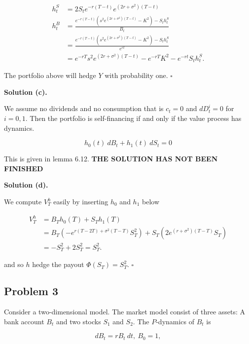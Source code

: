 \documentclass[
]{book}
\begin{document}
\begin{align*}
h_t^S&=2S_te^{-r(T-t)}e^{(2r+\sigma^2)(T-t)}\\
h_t^B&=\frac{e^{-r(T-t)}\left(s^2e^{(2r+\sigma^2)(T-t)}-K^2\right)-S_th_t^S}{B_t}\\
&=\frac{e^{-r(T-t)}\left(s^2e^{(2r+\sigma^2)(T-t)}-K^2\right)-S_th_t^S}{e^{rt}}\\
&=e^{-rT}s^2e^{(2r+\sigma^2)(T-t)}-e^{-rT}K^2-e^{-rt}S_th_t^S.
\end{align*}

The portfolio above will hedge \(Y\) with probability one. \(\square\)

\noindent\makebox[\linewidth]{\rule{\textwidth}{0.4pt}}

\textbf{Solution (c).}

We assume no dividends and no consumption that is \(c_t=0\) and \(dD_t^i=0\) for \(i=0,1\). Then the portfolio is self-financing if and only if the value process has dynamics.

\[
h_0(t)\ dB_t+h_1(t)\ dS_t=0
\]

This is given in lemma 6.12. \textbf{THE SOLUTION HAS NOT BEEN FINISHED}

\noindent\makebox[\linewidth]{\rule{\textwidth}{0.4pt}}

\textbf{Solution (d).}

We compute \(V_T^h\) easily by inserting \(h_0\) and \(h_1\) below

\begin{align*}
V_T^h&=B_Th_0(T)+S_Th_1(T)\\
&=B_T\left(-e^{r(T-2T)+\sigma^2(T-T)}S_T^2\right)+S_T\left(2e^{(r+\sigma^2)(T-T)}S_T\right)\\
&=-S_T^2+2S_T^2=S_T^2.
\end{align*}

and so \(h\) hedge the payout \(\Phi(S_T)=S_T^2\). \(\square\)

\noindent\makebox[\linewidth]{\rule{\textwidth}{0.4pt}}

\hypertarget{problem-3}{%
\subsection{Problem 3}\label{problem-3}}

Consider a two-dimensional model. The market model consist of three assets: A bank account \(B_t\) and two stocks \(S_1\) and \(S_2\). The \(P\)-dynamics of \(B_t\) is

\[
dB_t=rB_t\ dt,\ B_0=1,
\]
\end{document}
